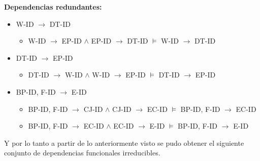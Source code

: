 \documentclass{report}
\begin{document}
    \textbf{Dependencias redundantes:}
    \begin{itemize}
        \item W-ID $\rightarrow$ DT-ID
        \begin{itemize}
            \item W-ID $\rightarrow$ EP-ID $\land$  EP-ID  $\rightarrow$ DT-ID $\models$ W-ID $\rightarrow$ DT-ID \newline
        \end{itemize}
        
        \item DT-ID $\rightarrow$ EP-ID
        \begin{itemize}
            \item DT-ID $\rightarrow$ W-ID $\land$  W-ID $\rightarrow$ EP-ID $\models$ DT-ID $\rightarrow$ EP-ID  \newline
        \end{itemize}

        \item BP-ID,  F-ID $\rightarrow$ E-ID

        \begin{itemize}
            \item BP-ID,  F-ID $\rightarrow$ CJ-ID $\land$ CJ-ID $\rightarrow$ EC-ID $\models$ BP-ID,  F-ID $\rightarrow$ EC-ID \newline
            \item BP-ID,  F-ID $\rightarrow$ EC-ID $\land$ EC-ID $\rightarrow$ E-ID $\models$ BP-ID,  F-ID $\rightarrow$ E-ID \newline
        \end{itemize}
    \end{itemize}

    Y por lo tanto a partir de lo anteriormente visto se pudo obtener el siguiente conjunto de dependencias 
    funcionales irreducibles. \newline
\end{document}
